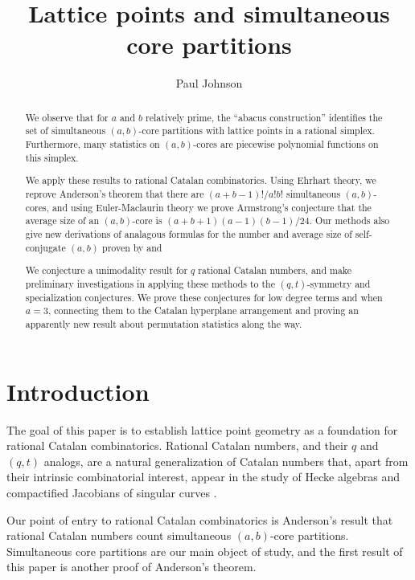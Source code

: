 \documentclass{amsart}[12pt]
\theoremstyle{definition}
\begin{document}
\title{Lattice points and simultaneous core partitions}
\begin{abstract}
We observe that for $a$ and $b$ relatively prime, the ``abacus construction'' identifies the set of simultaneous $(a,b)$-core partitions with lattice points in a rational simplex. Furthermore, many statistics on $(a,b)$-cores are piecewise polynomial functions on this simplex.  

We apply these results to rational Catalan combinatorics.  Using Ehrhart theory, we reprove Anderson's theorem \cite{anderson} that there are $(a+b-1)!/a!b!$ simultaneous $(a,b)$-cores, and using Euler-Maclaurin theory we prove Armstrong's conjecture \cite{AHJ} that the average size of an $(a,b)$-core is $(a+b+1)(a-1)(b-1)/24$.  Our methods also give new derivations of analagous formulas for the number and average size of self-conjugate $(a,b)$ proven by \cite{FMS} and \cite{CHW} 

We conjecture a unimodality result for $q$ rational Catalan numbers, and make preliminary investigations in applying these methods to the $(q,t)$-symmetry and specialization conjectures.  We prove these conjectures for low degree terms and when $a=3$, connecting them to the Catalan hyperplane arrangement and proving an apparently new result about permutation statistics along the way.

\end{abstract}


\author{Paul Johnson}
\date{}
\maketitle
\section{Introduction}
The goal of this paper is to establish lattice point geometry as a foundation for rational Catalan combinatorics.  Rational Catalan numbers, and their $q$ and $(q,t)$ analogs, are a natural generalization of Catalan numbers that, apart from their intrinsic combinatorial interest, appear in the study of Hecke algebras \cite{GG} and compactified Jacobians of singular curves \cite{EM1, EM2} . 
 
Our point of entry to rational Catalan combinatorics is Anderson's \cite{anderson} result that rational Catalan numbers count simultaneous $(a,b)$-core partitions.  Simultaneous core partitions are our main object of study, and the first result of this paper is another proof of Anderson's theorem.
\end{document}
